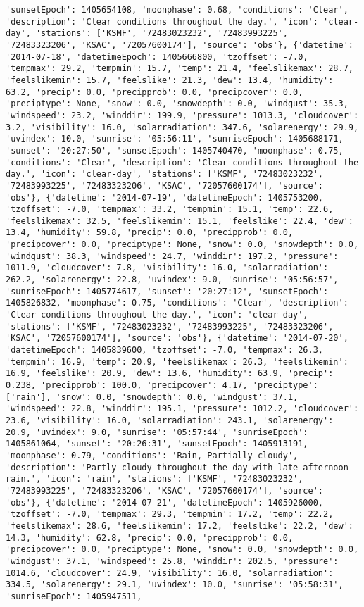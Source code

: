 \documentclass[
  letterpaper,
  DIV=11,
  numbers=noendperiod]{scrartcl}
\begin{document}
\begin{verbatim}
'sunsetEpoch': 1405654108, 'moonphase': 0.68, 'conditions': 'Clear', 'description': 'Clear conditions throughout the day.', 'icon': 'clear-day', 'stations': ['KSMF', '72483023232', '72483993225', '72483323206', 'KSAC', '72057600174'], 'source': 'obs'}, {'datetime': '2014-07-18', 'datetimeEpoch': 1405666800, 'tzoffset': -7.0, 'tempmax': 29.2, 'tempmin': 15.7, 'temp': 21.4, 'feelslikemax': 28.7, 'feelslikemin': 15.7, 'feelslike': 21.3, 'dew': 13.4, 'humidity': 63.2, 'precip': 0.0, 'precipprob': 0.0, 'precipcover': 0.0, 'preciptype': None, 'snow': 0.0, 'snowdepth': 0.0, 'windgust': 35.3, 'windspeed': 23.2, 'winddir': 199.9, 'pressure': 1013.3, 'cloudcover': 3.2, 'visibility': 16.0, 'solarradiation': 347.6, 'solarenergy': 29.9, 'uvindex': 10.0, 'sunrise': '05:56:11', 'sunriseEpoch': 1405688171, 'sunset': '20:27:50', 'sunsetEpoch': 1405740470, 'moonphase': 0.75, 'conditions': 'Clear', 'description': 'Clear conditions throughout the day.', 'icon': 'clear-day', 'stations': ['KSMF', '72483023232', '72483993225', '72483323206', 'KSAC', '72057600174'], 'source': 'obs'}, {'datetime': '2014-07-19', 'datetimeEpoch': 1405753200, 'tzoffset': -7.0, 'tempmax': 33.2, 'tempmin': 15.1, 'temp': 22.6, 'feelslikemax': 32.5, 'feelslikemin': 15.1, 'feelslike': 22.4, 'dew': 13.4, 'humidity': 59.8, 'precip': 0.0, 'precipprob': 0.0, 'precipcover': 0.0, 'preciptype': None, 'snow': 0.0, 'snowdepth': 0.0, 'windgust': 38.3, 'windspeed': 24.7, 'winddir': 197.2, 'pressure': 1011.9, 'cloudcover': 7.8, 'visibility': 16.0, 'solarradiation': 262.2, 'solarenergy': 22.8, 'uvindex': 9.0, 'sunrise': '05:56:57', 'sunriseEpoch': 1405774617, 'sunset': '20:27:12', 'sunsetEpoch': 1405826832, 'moonphase': 0.75, 'conditions': 'Clear', 'description': 'Clear conditions throughout the day.', 'icon': 'clear-day', 'stations': ['KSMF', '72483023232', '72483993225', '72483323206', 'KSAC', '72057600174'], 'source': 'obs'}, {'datetime': '2014-07-20', 'datetimeEpoch': 1405839600, 'tzoffset': -7.0, 'tempmax': 26.3, 'tempmin': 16.9, 'temp': 20.9, 'feelslikemax': 26.3, 'feelslikemin': 16.9, 'feelslike': 20.9, 'dew': 13.6, 'humidity': 63.9, 'precip': 0.238, 'precipprob': 100.0, 'precipcover': 4.17, 'preciptype': ['rain'], 'snow': 0.0, 'snowdepth': 0.0, 'windgust': 37.1, 'windspeed': 22.8, 'winddir': 195.1, 'pressure': 1012.2, 'cloudcover': 23.6, 'visibility': 16.0, 'solarradiation': 243.1, 'solarenergy': 20.9, 'uvindex': 9.0, 'sunrise': '05:57:44', 'sunriseEpoch': 1405861064, 'sunset': '20:26:31', 'sunsetEpoch': 1405913191, 'moonphase': 0.79, 'conditions': 'Rain, Partially cloudy', 'description': 'Partly cloudy throughout the day with late afternoon rain.', 'icon': 'rain', 'stations': ['KSMF', '72483023232', '72483993225', '72483323206', 'KSAC', '72057600174'], 'source': 'obs'}, {'datetime': '2014-07-21', 'datetimeEpoch': 1405926000, 'tzoffset': -7.0, 'tempmax': 29.3, 'tempmin': 17.2, 'temp': 22.2, 'feelslikemax': 28.6, 'feelslikemin': 17.2, 'feelslike': 22.2, 'dew': 14.3, 'humidity': 62.8, 'precip': 0.0, 'precipprob': 0.0, 'precipcover': 0.0, 'preciptype': None, 'snow': 0.0, 'snowdepth': 0.0, 'windgust': 37.1, 'windspeed': 25.8, 'winddir': 202.5, 'pressure': 1014.6, 'cloudcover': 24.9, 'visibility': 16.0, 'solarradiation': 334.5, 'solarenergy': 29.1, 'uvindex': 10.0, 'sunrise': '05:58:31', 'sunriseEpoch': 1405947511, 
\end{verbatim}
\end{document}
